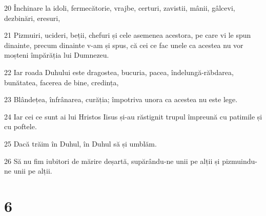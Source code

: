 \par 20 Închinare la idoli, fermecătorie, vrajbe, certuri, zavistii, mânii, gâlcevi, dezbinări, eresuri,
\par 21 Pizmuiri, ucideri, beții, chefuri și cele asemenea acestora, pe care vi le spun dinainte, precum dinainte v-am și spus, că cei ce fac unele ca acestea nu vor moșteni împărăția lui Dumnezeu.
\par 22 Iar roada Duhului este dragostea, bucuria, pacea, îndelungă-răbdarea, bunătatea, facerea de bine, credința,
\par 23 Blândețea, înfrânarea, curăția; împotriva unora ca acestea nu este lege.
\par 24 Iar cei ce sunt ai lui Hristos Iisus și-au răstignit trupul împreună cu patimile și cu poftele.
\par 25 Dacă trăim în Duhul, în Duhul să și umblăm.
\par 26 Să nu fim iubitori de mărire deșartă, supărându-ne unii pe alții și pizmuindu-ne unii pe alții.

\chapter{6}

